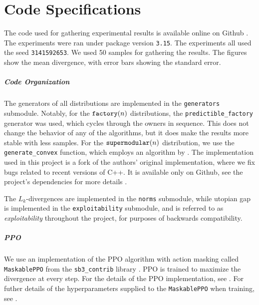 \chapter{Code Specifications}
\label{app:code}

The code used for gathering experimental results is available online on Github \citep{gitrepo}.
The experiments were ran under package version \texttt{3.15}.
The experiments all used the seed \texttt{3141592653}.
We used 50 samples for gathering the results.
The figures show the mean divergence, with error bars showing the standard error.

\paragraph{Code Organization}
The generators of all distributions are implemented in the \texttt{generators} submodule.
Notably, for the $ \texttt{factory}\!\left(n\right) $ distributions, the \texttt{predictible\_factory} generator was used, which cycles through the owners in sequence.
This does not change the behavior of any of the algorithms, but it does make the results more stable with less samples.
For the $ \texttt{supermodular}\!\left(n\right) $ distribution, we use the \texttt{generate\_convex} function, which employs an algorithm by \cite{9252865}.
The implementation used in this project is a fork of the authors' original implementation, where we fix bugs related to recent versions of C++.
It is available only on Github, see the project's dependencies for more details \citep{gitrepo}.

The $ L_k $-divergences are implemented in the \texttt{norms} submodule, while utopian gap is implemented in the \texttt{exploitability} submodule, and is referred to as \emph{exploitability} throughout the project, for purposes of backwards compatibility.

\paragraph{PPO}
We use an implementation of the PPO algorithm with action masking called \texttt{MaskablePPO} from the \texttt{sb3\_contrib} library \citep{stable-baselines3}.
PPO is trained to maximize the divergence at every step.
For the details of the PPO implementation, see \cite{stable-baselines3}.
For futher details of the hyperparameters supplied to the \texttt{MaskablePPO} when training, see .

